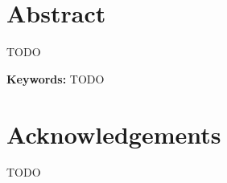 \chapter*{Abstract}

TODO



\vspace{3mm}
\noindent
\textbf{Keywords:}
TODO







\newpage
\chapter*{Acknowledgements}

TODO